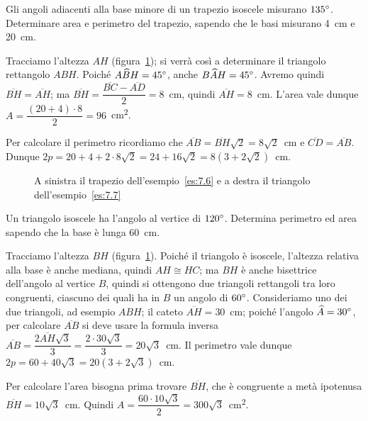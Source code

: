 \begin{exrig}
\begin{esempio}\label{es:7.6}
Gli angoli adiacenti alla base minore di un trapezio isoscele misurano $135{}^{\circ}$. Determinare area e perimetro del trapezio, sapendo che le basi misurano 4~cm e 20~cm.\vspace{7pt}

Tracciamo l'altezza $AH$ (figura~\ref{fig:es7.6}); si verrà così a determinare il triangolo rettangolo $ABH$. Poiché $A\widehat{B}H=45{}^{\circ}$, anche $B\widehat{A}H=45{}^{\circ}$. Avremo quindi $\overline{BH}=\overline{AH}$; ma $\overline{BH}=\dfrac{\overline{BC}-\overline{AD}}{2}=8$~cm, quindi $\overline{AH}=8$~cm. L'area vale dunque $A=\dfrac{(20+4)\cdot 8}{2}=96$~cm\textsuperscript{2}.

Per calcolare il perimetro ricordiamo che $\overline{AB}=\overline{BH}\sqrt{2}=8\sqrt{2}$~cm e $\overline{CD}=\overline{AB}$.
Dunque $2p=20+4+2\cdot 8\sqrt{2}=24+16\sqrt{2}=8(3+2\sqrt{2})$~cm.
\end{esempio}

\begin{figure}[!htb]
	\centering\hspace{1cm}
	
	\caption{A sinistra il trapezio dell'esempio~\ref{es:7.6} e a destra il triangolo dell'esempio~\ref{es:7.7}}\label{fig:es7.6}
\end{figure}

\begin{esempio}\label{es:7.7}
Un triangolo isoscele ha l'angolo al vertice di $120{}^{\circ}$. Determina perimetro ed area sapendo che la base è lunga 60~cm.\vspace{7pt}

Tracciamo l'altezza $BH$ (figura~\ref{fig:es7.6}). Poiché il triangolo è isoscele, l'altezza relativa alla base è anche mediana, quindi $AH\cong HC$; ma $BH$ è anche bisettrice dell'angolo al vertice $B$, quindi si ottengono due triangoli rettangoli tra loro congruenti, ciascuno dei quali ha in $B$ un angolo di $60{}^{\circ}$. Consideriamo uno dei due triangoli, ad esempio $ABH$; il cateto $\overline{AH}=30$~cm; poiché l'angolo $\widehat{A}=30{}^{\circ}$, per calcolare $\overline{AB}$ si deve usare la formula inversa $\overline{AB}=\dfrac{2\overline{AH}\sqrt{3}}{3}=\dfrac{2\cdot 30\sqrt{3}}{3}=20\sqrt{3}$~cm.
Il perimetro vale dunque $2p=60 + 40\sqrt{3} = 20 (3 + 2\sqrt{3})$~cm.

Per calcolare l'area bisogna prima trovare $\overline{BH}$, che è congruente a metà ipotenusa $\overline{BH}=10\sqrt{3}$~cm. Quindi $A=\dfrac{60\cdot 10\sqrt{3}}{2}=300\sqrt{3}$~cm\textsuperscript{2}.
\end{esempio}
\end{exrig}

